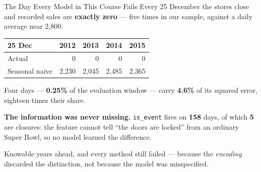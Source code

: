 \documentclass[aspectratio=169, 11pt]{beamer}
\begin{document}
\begin{frame}{The Day Every Model in This Course Fails}
  Every 25 December the stores close and recorded sales are \textbf{exactly zero} --- five times
  in our sample, against a daily average near 2{,}800.
  \begin{center}
    {\small
    \begin{tabular}{lrrrr}
      \toprule
      \textbf{25 Dec} & \textbf{2012} & \textbf{2013} & \textbf{2014} & \textbf{2015} \\
      \midrule
      Actual & 0 & 0 & 0 & 0 \\
      Seasonal naive & 2{,}230 & 2{,}045 & 2{,}485 & 2{,}365 \\
      \bottomrule
    \end{tabular}
    }
  \end{center}

  \vspace{-0.15cm}
  Four days --- \textbf{0.25\%} of the evaluation window --- carry \textbf{4.6\%} of its squared
  error, eighteen times their share.

  \vspace{0.05cm}
  \textbf{The information was never missing.} \texttt{is\_event} fires on \textbf{158} days, of
  which \textbf{5} are closures: the feature cannot tell ``the doors are locked'' from an ordinary
  Super Bowl, so no model learned the difference.

  \begin{keybox}
    Knowable years ahead, and every method still failed --- because the \emph{encoding} discarded
    the distinction, not because the model was misspecified.
  \end{keybox}
\end{frame}
\end{document}
